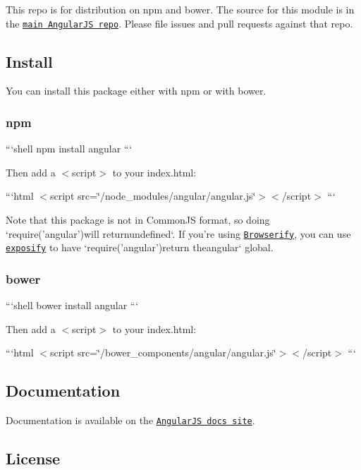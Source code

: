 This repo is for distribution on {\ttfamily npm} and {\ttfamily bower}. The source for this module is in the \href{https://github.com/angular/angular.js}{\tt main Angular\-J\-S repo}. Please file issues and pull requests against that repo.

\subsection*{Install}

You can install this package either with {\ttfamily npm} or with {\ttfamily bower}.

\subsubsection*{npm}

```shell npm install angular ```

Then add a {\ttfamily $<$script$>$} to your {\ttfamily index.\-html}\-:

```html $<$script src=\char`\"{}/node\-\_\-modules/angular/angular.\-js\char`\"{}$>$$<$/script$>$ ```

Note that this package is not in Common\-J\-S format, so doing `require('angular'){\ttfamily will return}undefined`. If you're using \href{https://github.com/substack/node-browserify}{\tt Browserify}, you can use \href{https://github.com/thlorenz/exposify}{\tt exposify} to have `require('angular'){\ttfamily return the}angular` global.

\subsubsection*{bower}

```shell bower install angular ```

Then add a {\ttfamily $<$script$>$} to your {\ttfamily index.\-html}\-:

```html $<$script src=\char`\"{}/bower\-\_\-components/angular/angular.\-js\char`\"{}$>$$<$/script$>$ ```

\subsection*{Documentation}

Documentation is available on the \href{http://docs.angularjs.org/}{\tt Angular\-J\-S docs site}.

\subsection*{License}

